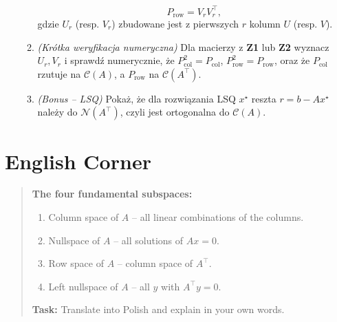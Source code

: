 \documentclass[12pt]{article}
\begin{document}
\begin{enumerate}[label=\textbf{Z\arabic*}.]
\begin{enumerate}[label=(\alph*)]
\[      P_{\mathrm{row}} = V_r V_r^\top,
    \]
    gdzie $U_r$ (resp. $V_r$) zbudowane jest z pierwszych $r$ kolumn $U$ (resp. $V$).
    \item \emph{(Krótka weryfikacja numeryczna)} Dla macierzy z \textbf{Z1} lub \textbf{Z2}
    wyznacz $U_r, V_r$ i sprawdź numerycznie, że $P_{\mathrm{col}}^2=P_{\mathrm{col}}$, 
    $P_{\mathrm{row}}^2=P_{\mathrm{row}}$, oraz że $P_{\mathrm{col}}$ rzutuje na $\mathcal{C}(A)$,
    a $P_{\mathrm{row}}$ na $\mathcal{C}(A^\top)$.
    \item \emph{(Bonus – LSQ)} Pokaż, że dla rozwiązania LSQ $x^\star$ reszta
    $r=b-Ax^\star$ należy do $\mathcal{N}(A^\top)$, czyli jest ortogonalna do $\mathcal{C}(A)$.
  \end{enumerate}
\end{enumerate}


\section*{English Corner}
\begin{quote}
\textbf{The four fundamental subspaces:}
\begin{enumerate}
\item Column space of \(A\) – all linear combinations of the columns.
\item Nullspace of \(A\) – all solutions of \(Ax=0\).
\item Row space of \(A\) – column space of \(A^\top\).
\item Left nullspace of \(A\) – all \(y\) with \(A^\top y=0\).
\end{enumerate}

\medskip
\textbf{Task:} Translate into Polish and explain in your own words.
\end{quote}
\end{document}
